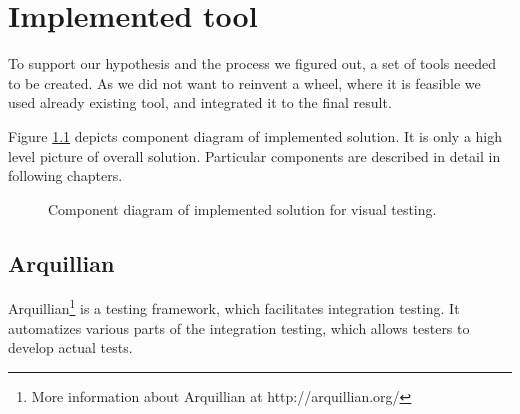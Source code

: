 \documentclass[11pt,oneside,final]{fithesis2}
\begin{document}
  
\chapter{Implemented tool}
To support our hypothesis and the process we figured out, a set of tools needed to be created. As we did
not want to reinvent a wheel, where it is feasible we used already existing tool, and integrated it to the
final result.

Figure \ref{fig:componentDiagramOfImpl} depicts component diagram of implemented solution. It is only a high
level picture of overall solution. Particular components are described in detail in following chapters.

\begin{figure}[!htb]
    \begin{center}
    \leavevmode
    \centerline{}
    \end{center}
    \caption{Component diagram of implemented solution for visual testing.}
    \label{fig:componentDiagramOfImpl}
\end{figure}
  
\section{Arquillian}
Arquillian\footnote{More information about Arquillian at http://arquillian.org/} is a testing framework, which facilitates integration testing. It automatizes various parts
of the integration testing, which allows testers to develop actual tests.
\end{document}
